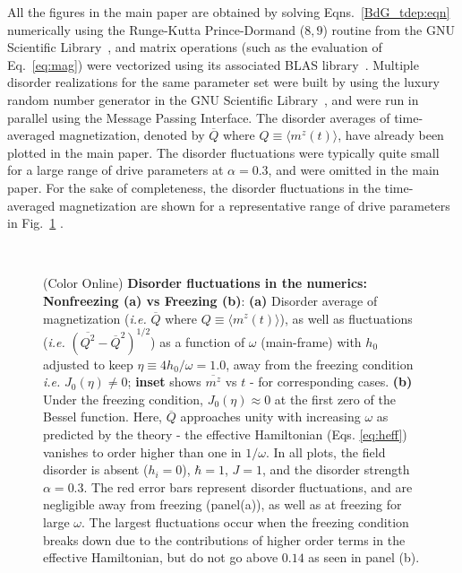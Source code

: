 \documentclass[aps,prl, notitlepage]{revtex4-1}
\begin{document}
All the figures in the main paper are obtained by solving Eqns.~\ref{BdG_tdep:eqn} numerically using the Runge-Kutta Prince-Dormand ($8,9$) routine from the GNU Scientific Library~\cite{GSL}, and matrix operations (such as the evaluation of Eq.~\ref{eq:mag}) were vectorized using its associated  BLAS library~\cite{BLAS}. Multiple disorder realizations for the same parameter set were built by using the luxury random number generator in the GNU Scientific Library~\cite{GSL}, and were run in parallel using the Message Passing Interface. The disorder averages of time-averaged magnetization, denoted by $\overline{Q}$ where $Q \equiv \langle m^{z}(t)\rangle$, have already been plotted in the main paper. The disorder fluctuations were typically quite small for a large range of drive parameters at $\alpha=0.3$, and were omitted in the main paper. For the sake of completeness, the disorder fluctuations in the time-averaged magnetization are shown for a representative range of drive parameters in Fig.~\ref{fig:errbars}
.
\begin{figure}[t]
\ 
\caption{(Color Online) 
{\bf Disorder fluctuations in the numerics: Nonfreezing (a) vs Freezing (b)}:
{\bf (a)} Disorder average of magnetization (\textit{i.e.}  $\overline{Q}$ where  $Q\equiv\langle m^z(t)\rangle$), as well as fluctuations
(\textit{i.e.} $(\overline{Q^2}-\overline{Q}^2)^{1/2}$) as a function of $\omega$ (main-frame) with $h_0$ adjusted to keep $\eta\equiv 4h_0/\omega=1.0$, away from the freezing condition \textit{i.e.} $J_0(\eta) \ne 0$; {\bf inset} shows $\overline{m^{z}}$ vs $t$ - for corresponding cases. {\bf(b)} Under the freezing condition, $J_0(\eta) \approx 0$ at the first zero of the Bessel function. Here, $\overline{Q}$ approaches unity with increasing $\omega$ as predicted by the theory - the effective Hamiltonian (Eqs. \ref{eq:heff}) vanishes to order higher than one in $1/\omega$. In all plots, the field disorder is absent ($h_i=0$), $\hbar=1$, $J=1$, and the disorder strength $\alpha = 0.3$. The red error bars represent disorder fluctuations, and are negligible away from freezing (panel(a)), as well as at freezing for large $\omega$. The largest fluctuations occur when the freezing condition breaks down due to the contributions of higher order terms in the effective Hamiltonian, but do not go above $0.14$ as seen 
in panel (b).}
\label{fig:errbars}
\end{figure}
\end{document}

